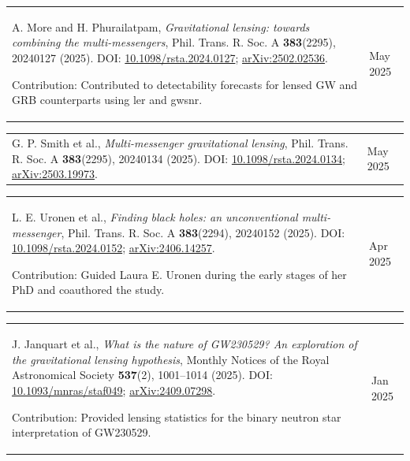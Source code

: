 \documentclass[margin,line]{res}
\begin{document}
\begin{resume}
\begin{tabular}{@{}p{\dimexpr\linewidth-0.62in-3\tabcolsep\relax}p{0.62in}}
    A. More and H. Phurailatpam, \textit{Gravitational lensing: towards combining the multi-messengers}, Phil. Trans. R. Soc. A \textbf{383}(2295), 20240127 (2025). DOI: \href{https://doi.org/10.1098/rsta.2024.0127}{10.1098/rsta.2024.0127}; \href{https://arxiv.org/abs/2502.02536}{arXiv:2502.02536}.
    \par\smallskip Contribution: Contributed to detectability forecasts for lensed GW and GRB counterparts using ler and gwsnr. & \raggedright May 2025
\end{tabular}

\begin{tabular}{@{}p{\dimexpr\linewidth-0.62in-3\tabcolsep\relax}p{0.62in}}
    G. P. Smith et al., \textit{Multi-messenger gravitational lensing}, Phil. Trans. R. Soc. A \textbf{383}(2295), 20240134 (2025). DOI: \href{https://doi.org/10.1098/rsta.2024.0134}{10.1098/rsta.2024.0134}; \href{https://arxiv.org/abs/2503.19973}{arXiv:2503.19973}. & \raggedright May 2025
\end{tabular}

\begin{tabular}{@{}p{\dimexpr\linewidth-0.62in-3\tabcolsep\relax}p{0.62in}}
    L. E. Uronen et al., \textit{Finding black holes: an unconventional multi-messenger}, Phil. Trans. R. Soc. A \textbf{383}(2294), 20240152 (2025). DOI: \href{https://doi.org/10.1098/rsta.2024.0152}{10.1098/rsta.2024.0152}; \href{https://arxiv.org/abs/2406.14257}{arXiv:2406.14257}.
    \par\smallskip Contribution: Guided Laura E. Uronen during the early stages of her PhD and coauthored the study. & \raggedright Apr 2025
\end{tabular}

\begin{tabular}{@{}p{\dimexpr\linewidth-0.62in-3\tabcolsep\relax}p{0.62in}}
    J. Janquart et al., \textit{What is the nature of GW230529? An exploration of the gravitational lensing hypothesis}, Monthly Notices of the Royal Astronomical Society \textbf{537}(2), 1001--1014 (2025). DOI: \href{https://doi.org/10.1093/mnras/staf049}{10.1093/mnras/staf049}; \href{https://arxiv.org/abs/2409.07298}{arXiv:2409.07298}.
    \par\smallskip Contribution: Provided lensing statistics for the binary neutron star interpretation of GW230529. & \raggedright Jan 2025
\end{tabular}


\end{resume}
\end{document}
